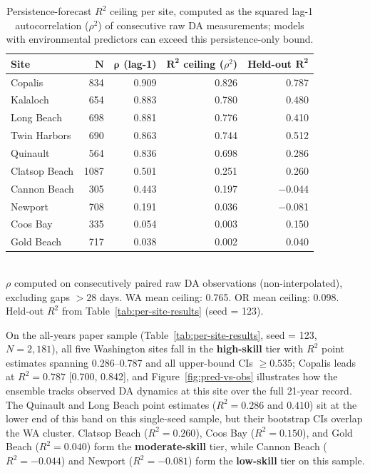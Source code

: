 \documentclass[toxins,article,submit,moreauthors]{Definitions/mdpi}
\begin{document}
\begin{table}[H]
\end{table}

\begin{table}[H]
\caption{Persistence-forecast $R^2$ ceiling per site, computed as the squared lag-1 autocorrelation ($\rho^2$) of consecutive raw DA measurements; models with environmental predictors can exceed this persistence-only bound.}
\label{tab:predictability-ceiling}
\centering\small
\begin{tabular*}{\linewidth}{@{\extracolsep{\fill}}lrrrr}
\toprule
\textbf{Site} & $\boldsymbol{N}$ & $\boldsymbol{\rho}$ \textbf{(lag-1)} & $\boldsymbol{R^2}$ \textbf{ceiling} ($\rho^2$) & \textbf{Held-out} $\boldsymbol{R^2}$ \\
\midrule
Copalis       & 834 & 0.909 & 0.826 & 0.787 \\
Kalaloch      & 654 & 0.883 & 0.780 & 0.480 \\
Long Beach    & 698 & 0.881 & 0.776 & 0.410 \\
Twin Harbors  & 690 & 0.863 & 0.744 & 0.512 \\
Quinault      & 564 & 0.836 & 0.698 & 0.286 \\
\addlinespace
Clatsop Beach & 1087 & 0.501 & 0.251 & 0.260 \\
Cannon Beach  &  305 & 0.443 & 0.197 & $-$0.044 \\
Newport       &  708 & 0.191 & 0.036 & $-$0.081 \\
Coos Bay      &  335 & 0.054 & 0.003 & 0.150 \\
Gold Beach    &  717 & 0.038 & 0.002 & 0.040 \\
\bottomrule
\end{tabular*}
\vspace{0.3em}\\
\footnotesize{$\rho$ computed on consecutively paired raw DA observations (non-interpolated), excluding gaps $> 28$ days. WA mean ceiling: 0.765. OR mean ceiling: 0.098. Held-out $R^2$ from Table~\ref{tab:per-site-results} (seed = 123).}
\end{table}

On the all-years paper sample (Table~\ref{tab:per-site-results}, seed = 123, $N = 2{,}181$), all five Washington sites fall in the \textbf{high-skill} tier with $R^2$ point estimates spanning 0.286--0.787 and all upper-bound CIs $\geq 0.535$; Copalis leads at $R^2 = 0.787$ [0.700, 0.842], and Figure~\ref{fig:pred-vs-obs} illustrates how the ensemble tracks observed DA dynamics at this site over the full 21-year record. The Quinault and Long Beach point estimates ($R^2 = 0.286$ and $0.410$) sit at the lower end of this band on this single-seed sample, but their bootstrap CIs overlap the WA cluster. Clatsop Beach ($R^2 = 0.260$), Coos Bay ($R^2 = 0.150$), and Gold Beach ($R^2 = 0.040$) form the \textbf{moderate-skill} tier, while Cannon Beach ($R^2 = -0.044$) and Newport ($R^2 = -0.081$) form the \textbf{low-skill} tier on this sample.
\end{document}
